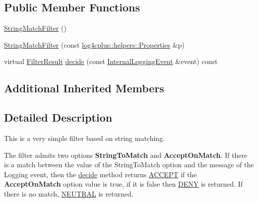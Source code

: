 \subsection*{Public Member Functions}
\begin{DoxyCompactItemize}
\item 
\hyperlink{classlog4cplus_1_1spi_1_1StringMatchFilter_a3166e025b86a147a8197e0cd33e0581e}{String\-Match\-Filter} ()
\item 
\hyperlink{classlog4cplus_1_1spi_1_1StringMatchFilter_a6f8e693de308c92c9cdca12a98fc34ea}{String\-Match\-Filter} (const \hyperlink{classlog4cplus_1_1helpers_1_1Properties}{log4cplus\-::helpers\-::\-Properties} \&p)
\item 
virtual \hyperlink{namespacelog4cplus_1_1spi_aa910f475d36c00f943ef78e37d11e3f6}{Filter\-Result} \hyperlink{classlog4cplus_1_1spi_1_1StringMatchFilter_a6b9f1b930b9a045ff668aae689e798bb}{decide} (const \hyperlink{classlog4cplus_1_1spi_1_1InternalLoggingEvent}{Internal\-Logging\-Event} \&event) const 
\end{DoxyCompactItemize}
\subsection*{Additional Inherited Members}


\subsection{Detailed Description}
This is a very simple filter based on string matching.

The filter admits two options {\bfseries String\-To\-Match} and {\bfseries Accept\-On\-Match}. If there is a match between the value of the String\-To\-Match option and the message of the Logging event, then the \hyperlink{classlog4cplus_1_1spi_1_1StringMatchFilter_a6b9f1b930b9a045ff668aae689e798bb}{decide} method returns \hyperlink{namespacelog4cplus_1_1spi_aa910f475d36c00f943ef78e37d11e3f6a222b6ce4c30f1d7d9164b901bb2907a7}{A\-C\-C\-E\-P\-T} if the {\bfseries Accept\-On\-Match} option value is true, if it is false then \hyperlink{namespacelog4cplus_1_1spi_aa910f475d36c00f943ef78e37d11e3f6a4782fd85324c15b37a4de87628f51634}{D\-E\-N\-Y} is returned. If there is no match, \hyperlink{namespacelog4cplus_1_1spi_aa910f475d36c00f943ef78e37d11e3f6ae75ab2e37a542c14fe57be606502a550}{N\-E\-U\-T\-R\-A\-L} is returned. 

